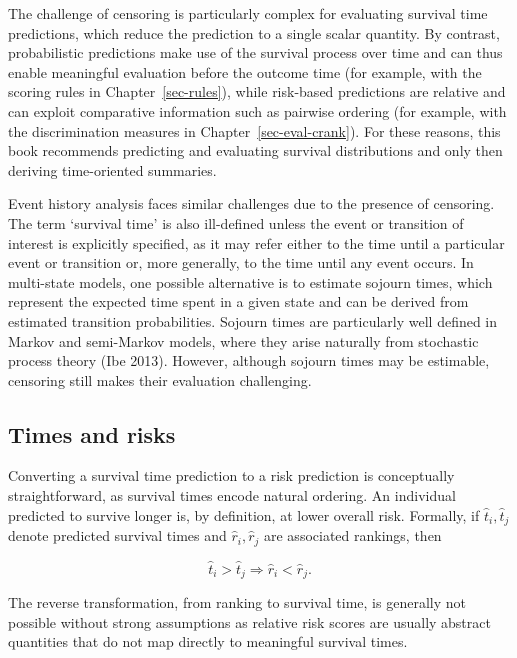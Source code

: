 \documentclass[
  letterpaper,
  krantz2]{style/krantz}
\begin{document}
The challenge of censoring is particularly complex for evaluating
survival time predictions, which reduce the prediction to a single
scalar quantity. By contrast, probabilistic predictions make use of the
survival process over time and can thus enable meaningful evaluation
before the outcome time (for example, with the scoring rules in
Chapter~\ref{sec-rules}), while risk-based predictions are relative and
can exploit comparative information such as pairwise ordering (for
example, with the discrimination measures in
Chapter~\ref{sec-eval-crank}). For these reasons, this book recommends
predicting and evaluating survival distributions and only then deriving
time-oriented summaries.

Event history analysis faces similar
challenges due to the presence of censoring. The term `survival time' is
also ill-defined unless the event or transition of interest is
explicitly specified, as it may refer either to the time until a
particular event or transition or, more generally, to the time until any
event occurs. In multi-state models, one
possible alternative is to estimate sojourn times,
which represent the expected time spent in a given state and can be
derived from estimated transition
probabilities. Sojourn times are
particularly well defined in Markov and semi-Markov
models, where they arise naturally from stochastic process theory (Ibe
2013). However, although sojourn times may be estimable, censoring still
makes their evaluation challenging.

\subsection{Times and risks}\label{times-and-risks}

Converting a survival time prediction to a risk prediction is
conceptually straightforward, as survival times encode natural ordering.
An individual predicted to survive longer is, by definition, at lower
overall risk. Formally, if \(\hat{t}_i,\hat{t}_j\)
denote predicted survival times and \(\hat{r}_i,\hat{r}_j\) are
associated rankings, then

\[
\hat{t}_i > \hat{t}_j \Rightarrow \hat{r}_i < \hat{r}_j.
\]

The reverse transformation, from ranking to survival time, is generally
not possible without strong assumptions as relative risk scores are
usually abstract quantities that do not map directly to meaningful
survival times.
\end{document}
